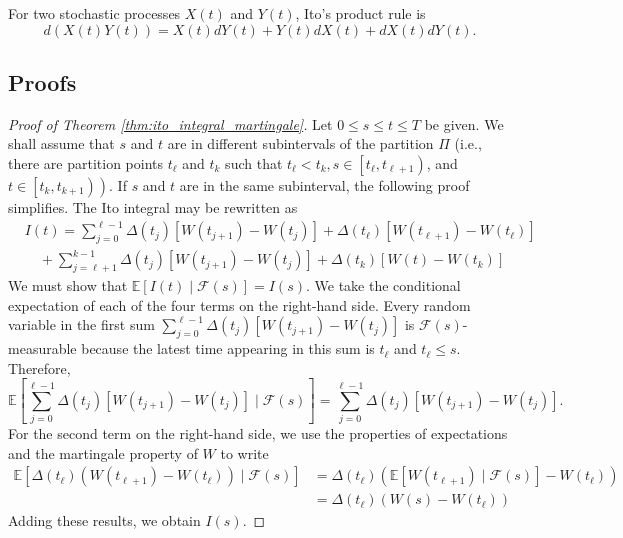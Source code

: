 \documentclass[\topdir/lecture\_notes.tex]{subfiles}
\begin{document}
For two stochastic processes $X(t)$ and $Y(t)$, Ito's product rule is
\begin{equation*}
d(X(t) Y(t))=X(t) d Y(t)+Y(t) d X(t)+d X(t) d Y(t).
\end{equation*}
\begin{optional}
\subsection{Proofs}\label{subsec:ito_proofs}

\begin{proof}[Proof of Theorem \ref{thm:ito_integral_martingale}]
Let $0 \leq s \leq t \leq T$ be given. We shall assume that $s$ and $t$ are in different subintervals of the partition $\Pi$ (i.e., there are partition points $t_{\ell}$ and $t_{k}$ such that $t_{\ell}<t_{k}, s \in\left[t_{\ell}, t_{\ell+1}\right)$, and $\left.t \in\left[t_{k}, t_{k+1}\right)\right)$. If $s$ and $t$ are in the same subinterval, the following proof simplifies. The Ito integral may be rewritten as
\begin{align}
& I(t)=\sum_{j=0}^{\ell-1} \Delta\left(t_{j}\right)\left[W\left(t_{j+1}\right)-W\left(t_{j}\right)\right]+\Delta\left(t_{\ell}\right)\left[W\left(t_{\ell+1}\right)-W\left(t_{\ell}\right)\right] \\
& \quad+\sum_{j=\ell+1}^{k-1} \Delta\left(t_{j}\right)\left[W\left(t_{j+1}\right)-W\left(t_{j}\right)\right]+\Delta\left(t_{k}\right)\left[W(t)-W\left(t_{k}\right)\right]
\label{4.2.3}
\end{align}
We must show that $\mathbb{E}[I(t) \mid \mathcal{F}(s)]=I(s)$. We take the conditional expectation of each of the four terms on the right-hand side. Every random variable in the first sum $\sum_{j=0}^{\ell-1} \Delta\left(t_{j}\right)\left[W\left(t_{j+1}\right)-W\left(t_{j}\right)\right]$ is $\mathcal{F}(s)$-measurable because the latest time appearing in this sum is $t_{\ell}$ and $t_{\ell} \leq s$. Therefore,
\begin{equation}
\mathbb{E}\left[\sum_{j=0}^{\ell-1} \Delta\left(t_{j}\right)\left[W\left(t_{j+1}\right)-W\left(t_{j}\right)\right] \mid \mathcal{F}(s)\right]=\sum_{j=0}^{\ell-1} \Delta\left(t_{j}\right)\left[W\left(t_{j+1}\right)-W\left(t_{j}\right)\right]. \label{4.2.4}
\end{equation}
For the second term on the right-hand side, we use the properties of expectations and the martingale property of $W$ to write
\begin{align}
\mathbb{E}\left[\Delta\left(t_{\ell}\right)\left(W\left(t_{\ell+1}\right)-W\left(t_{\ell}\right)\right) \mid \mathcal{F}(s)\right] & =\Delta\left(t_{\ell}\right)\left(\mathbb{E}\left[W\left(t_{\ell+1}\right) \mid \mathcal{F}(s)\right]-W\left(t_{\ell}\right)\right) \\
& =\Delta\left(t_{\ell}\right)\left(W(s)-W\left(t_{\ell}\right)\right)
\label{4.2.5}
\end{align}
Adding these results, we obtain $I(s)$.


\end{proof}
\end{optional}
\end{document}
